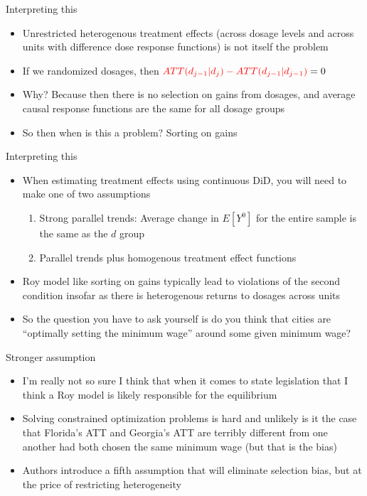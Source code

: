 \documentclass{beamer}
\begin{document}
\begin{frame}{Interpreting this}

\begin{itemize}
\item Unrestricted heterogenous treatment effects (across dosage levels and across units with difference dose response functions) is not itself the problem
\item If we randomized dosages, then $\textcolor{red}{ATT(d_{j-1} | d_j) - ATT(d_{j-1} | d_{j-1})}=0$
\item Why?  Because then there is no selection on gains from dosages, and average causal response functions are the same for all dosage groups
\item So then when is this a problem?  Sorting on gains
\end{itemize}

\end{frame}

\begin{frame}{Interpreting this}

\begin{itemize}

\item When estimating treatment effects using continuous DiD, you will need to make one of two assumptions
	\begin{enumerate}
	\item Strong parallel trends: Average change in $E[Y^0]$ for the entire sample is the same as the $d$ group
	\item Parallel trends plus homogenous treatment effect functions
	\end{enumerate}
\item Roy model like sorting on gains typically lead to violations of the second condition insofar as there is heterogenous returns to dosages across units
\item So the question you have to ask yourself is do you think that cities are ``optimally setting the minimum wage'' around some given minimum wage?
\end{itemize}

\end{frame}

\begin{frame}{Stronger assumption}

\begin{itemize}

\item I'm really not so sure I think that when it comes to state legislation that I think a Roy model is likely responsible for the equilibrium
\item Solving constrained optimization problems is hard and unlikely is it the case that Florida's ATT and Georgia's ATT are terribly different from one another had both chosen the same minimum wage (but that is the bias)
\item Authors introduce a fifth assumption that will eliminate selection bias, but at the price of restricting heterogeneity

\end{itemize}

\end{frame}
\end{document}
